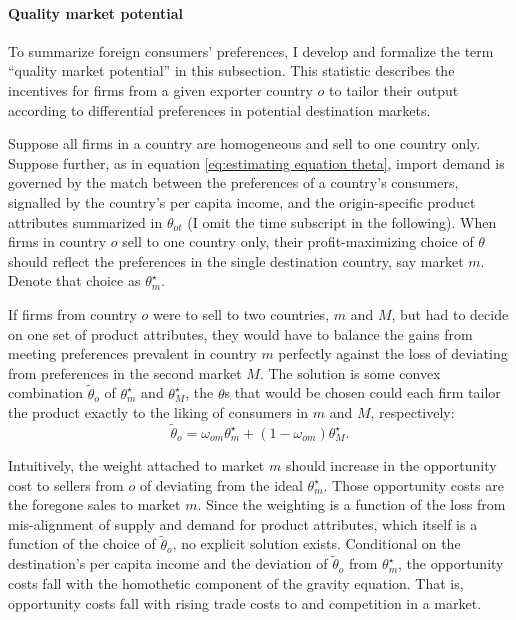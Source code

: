 \documentclass[12pt,a4paper,oneside,times]{article}   	%
\begin{document}
\paragraph{Quality market potential}
To summarize foreign consumers' preferences, I develop and formalize the term ``quality market potential'' in this subsection. This statistic describes the incentives for firms from a given exporter country $o$ to tailor their output according to differential preferences in potential destination markets.

Suppose all firms in a country are homogeneous and sell to one country only. Suppose further, as in equation \eqref{eq:estimating equation theta}, import demand is governed by the match between the preferences of a country's consumers, signalled by the country's per capita income, and the origin-specific product attributes summarized in $\theta_{ot}$ (I omit the time subscript in the following). When firms in country $o$ sell to one country only, their profit-maximizing choice of $\theta$ should reflect the preferences in the single destination country, say market $m$. Denote that choice as $\theta_m^\star$. 

If firms from country $o$ were to sell to two countries, $m$ and $M$, but had to decide on one set of product attributes, they would have to balance the gains from meeting preferences prevalent in country  $m$ perfectly against the loss of deviating from preferences in the second market $M$. The solution is some convex combination $\tilde{\theta}_{o}$ of $\theta_m^\star$ and $\theta_M^\star$, the $\theta$s that would be chosen could each firm tailor the product exactly to the liking of consumers in $m$ and $M$, respectively: 
\begin{equation}\label{eq: QMP simple}
\tilde{\theta}_{o} = \omega_{om}\theta^\star_m + (1-\omega_{om})\theta^\star_M.  
\end{equation}

Intuitively, the weight attached to market $m$ should increase in the opportunity cost to sellers from $o$ of deviating from the ideal $\theta_m^\star$. Those opportunity costs are the foregone sales to market $m$. Since the weighting is a function of the loss from mis-alignment of supply and demand for product attributes, which itself is a function of the choice of $\tilde{\theta}_{o}$, no explicit solution exists. Conditional on the destination's per capita income and the deviation of  $\tilde{\theta}_{o}$ from $\theta_m^\star$, the opportunity costs fall with the homothetic component of the gravity equation. That is, opportunity costs fall with rising trade costs to and competition in a market. 
\end{document}

